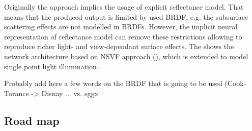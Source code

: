 \documentclass[english]{article}
\newcommand{\rphr}[1]{{\color{blue}#1}}
\begin{document}
Originally the approach implies the usage of explicit reflectance model.
That means that the produced output is limited by used BRDF, e.g. the subsurface scattering effects are not modelled in BRDFs.
However, the implicit neural representation of reflectance model can remove these restrictions allowing to reproduce richer light- and view-dependant surface effects. The  shows the network architecture based on NSVF approach (\cite{nsvf2020}), which is extended to model single point light illumination.

\rphr{Probably add here a few words on the BRDF that is going to be used (Cook-Torance -> Disnay ... vs. sggx}


\subsection{Road map}
\label{roadmap}
\end{document}

